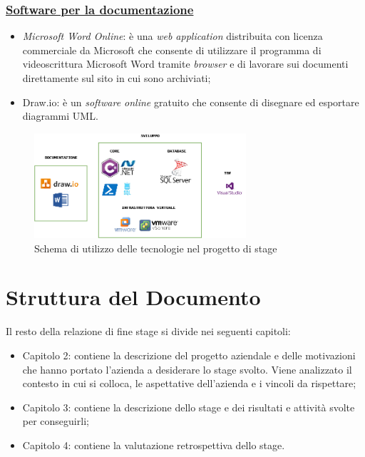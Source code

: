 \subsubsection{\underline{Software per la documentazione}}
\begin{itemize}
    \item \emph{Microsoft Word Online}: è una \emph{web application} distribuita con licenza commerciale da Microsoft che consente di utilizzare il programma di videoscrittura Microsoft Word tramite \emph{browser} e di lavorare sui documenti direttamente sul sito in cui sono archiviati;
    \item Draw.io: è un \emph{software online} gratuito che consente di disegnare ed esportare diagrammi UML.
\end{itemize}
     \begin{figure}[H]
        \centering
        \captionsetup{justification=centering,margin=2cm}
            \includegraphics[width=0.7\textwidth ]{figures/tecno.png}
            \caption [Teconologie stage]{Schema di utilizzo delle tecnologie nel progetto di stage \label{fig:tecnologie}}
    \end{figure}
    

\section{Struttura del Documento}
Il resto della relazione di fine stage si divide nei seguenti capitoli:
\begin{itemize}
    \item Capitolo 2: contiene la descrizione del progetto aziendale e delle motivazioni che hanno portato l’azienda a desiderare lo stage svolto. Viene analizzato il contesto in cui si colloca, le aspettative dell’azienda e i vincoli da rispettare;
    \item Capitolo 3: contiene la descrizione dello stage e dei risultati e attività svolte per conseguirli;
    \item Capitolo 4: contiene la valutazione retrospettiva dello stage.
\end{itemize}

